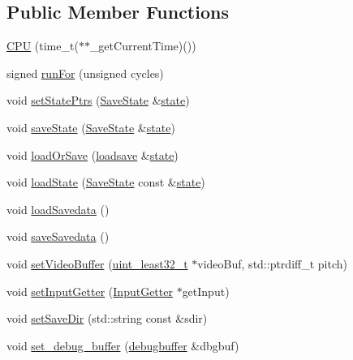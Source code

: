 \subsection*{Public Member Functions}
\begin{DoxyCompactItemize}
\item 
\hyperlink{classgambatte_1_1CPU_ad2f22383ec6a786778ceb7f834871714}{C\+PU} (time\+\_\+t($\ast$$\ast$\+\_\+get\+Current\+Time)())
\item 
signed \hyperlink{classgambatte_1_1CPU_a578dc9523b8c4fd01b65bac8ab66f3dd}{run\+For} (unsigned cycles)
\item 
void \hyperlink{classgambatte_1_1CPU_ad3536333dfdf2152288d68cd6a0f85f6}{set\+State\+Ptrs} (\hyperlink{structgambatte_1_1SaveState}{Save\+State} \&\hyperlink{ppu_8cpp_a2f2eca6997ee7baf8901725ae074d45b}{state})
\item 
void \hyperlink{classgambatte_1_1CPU_ad18d4bce08093c8c927b68cc2f3339bb}{save\+State} (\hyperlink{structgambatte_1_1SaveState}{Save\+State} \&\hyperlink{ppu_8cpp_a2f2eca6997ee7baf8901725ae074d45b}{state})
\item 
void \hyperlink{classgambatte_1_1CPU_a8e6bb830ddf5af65d28cf3ebfcbddf02}{load\+Or\+Save} (\hyperlink{classgambatte_1_1loadsave}{loadsave} \&\hyperlink{ppu_8cpp_a2f2eca6997ee7baf8901725ae074d45b}{state})
\item 
void \hyperlink{classgambatte_1_1CPU_a92e34858fac97ce269cf72ff114d3e7e}{load\+State} (\hyperlink{structgambatte_1_1SaveState}{Save\+State} const \&\hyperlink{ppu_8cpp_a2f2eca6997ee7baf8901725ae074d45b}{state})
\item 
void \hyperlink{classgambatte_1_1CPU_a8b03ef8733dc634d39998d80c3a75be5}{load\+Savedata} ()
\item 
void \hyperlink{classgambatte_1_1CPU_a4ece2687dec833880531bfaf010e63a6}{save\+Savedata} ()
\item 
void \hyperlink{classgambatte_1_1CPU_a7e12310942f8986295086a9f9c5217ba}{set\+Video\+Buffer} (\hyperlink{namespacegambatte_a0639f09fccfbbd5a8e0796318768e370}{uint\+\_\+least32\+\_\+t} $\ast$video\+Buf, std\+::ptrdiff\+\_\+t pitch)
\item 
void \hyperlink{classgambatte_1_1CPU_a7e9b00d6068a5d4b3b1f3467c6fda8ca}{set\+Input\+Getter} (\hyperlink{classgambatte_1_1InputGetter}{Input\+Getter} $\ast$get\+Input)
\item 
void \hyperlink{classgambatte_1_1CPU_a9c882b42b4e426ae9368a181108f6e92}{set\+Save\+Dir} (std\+::string const \&sdir)
\item 
void \hyperlink{classgambatte_1_1CPU_a3c14c0089808692b7e26033bcc6ad4c9}{set\+\_\+debug\+\_\+buffer} (\hyperlink{structgambatte_1_1debugbuffer}{debugbuffer} \&dbgbuf)
$$
\end{DoxyCompactItemize}
